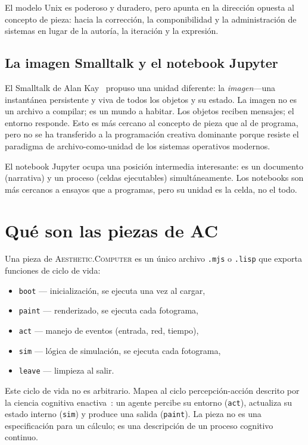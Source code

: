 \documentclass[10pt,letterpaper,twocolumn]{article}
\newcommand{\ac}{\textsc{Aesthetic.Computer}}
\begin{document}
El modelo Unix es poderoso y duradero, pero apunta en la dirección opuesta al concepto de pieza: hacia la corrección, la componibilidad y la administración de sistemas en lugar de la autoría, la iteración y la expresión.

\subsection{La imagen Smalltalk y el notebook Jupyter}

El Smalltalk de Alan Kay~\citep{kay1977personal} propuso una unidad diferente: la \emph{imagen}---una instantánea persistente y viva de todos los objetos y su estado. La imagen no es un archivo a compilar; es un mundo a habitar. Los objetos reciben mensajes; el entorno responde. Esto es más cercano al concepto de pieza que al de programa, pero no se ha transferido a la programación creativa dominante porque resiste el paradigma de archivo-como-unidad de los sistemas operativos modernos.

El notebook Jupyter ocupa una posición intermedia interesante: es un documento (narrativa) y un proceso (celdas ejecutables) simultáneamente. Los notebooks son más cercanos a ensayos que a programas, pero su unidad es la celda, no el todo.

\section{Qué son las piezas de AC}

Una pieza de \ac{} es un único archivo \texttt{.mjs} o \texttt{.lisp} que exporta funciones de ciclo de vida:

\begin{itemize}
  \item \texttt{boot} --- inicialización, se ejecuta una vez al cargar,
  \item \texttt{paint} --- renderizado, se ejecuta cada fotograma,
  \item \texttt{act} --- manejo de eventos (entrada, red, tiempo),
  \item \texttt{sim} --- lógica de simulación, se ejecuta cada fotograma,
  \item \texttt{leave} --- limpieza al salir.
\end{itemize}

Este ciclo de vida no es arbitrario. Mapea al ciclo percepción-acción descrito por la ciencia cognitiva enactiva~\citep{varela1991embodied}: un agente percibe su entorno (\texttt{act}), actualiza su estado interno (\texttt{sim}) y produce una salida (\texttt{paint}). La pieza no es una especificación para un cálculo; es una descripción de un proceso cognitivo continuo.
\end{document}
